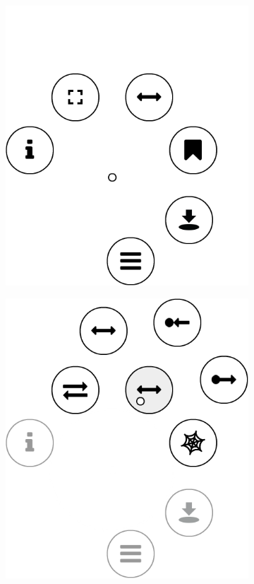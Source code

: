\begin{figure}[htb]
  \centering
  \begin{subfigure}[b]{\fwidth}
    \centering
    \includegraphics[scale=0.45]{figures/edge-contextmenu}
     \label{fig:edge-contextmenu-initial}
  \end{subfigure}
  \hfill
  \begin{subfigure}[b]{\fwidth}
    \centering
    \includegraphics[scale=0.45]{figures/edge-contextmenu-connections}

\end{subfigure}
\end{figure}
